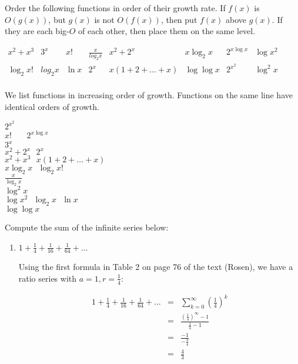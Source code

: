 \documentclass[12pt]{amsart}
\begin{document}
\begin{enumerate}
{\bf \item Order the following functions in order of their growth rate.  If $f(x)$ is $O(g(x))$, but $g(x)$ is not $O(f(x))$, then put $f(x)$ above $g(x)$.  If they are each big-$O$ of each other, then place them on the same level.

\medskip
\begin{math}
\begin{array}{llllllll}
x^2 + x^3 & 3^x & x! & \frac{x}{log_2 x} & x^2+2^x & x \log_2 x & 2^{x\log x} & \log x^2 \\
\log_2 x! & log_2 x & \ln x & 2^x & x(1+2+\ldots+x) & \log \log x & 2^{x^2} & \log^2 x \\
\end{array}
\end{math}
}

We list functions in increasing order of growth.  Functions on the
same line have identical orders of growth.

\begin{center}
$2^{x^2}$ \\
$x!$ \ \ \ $2^{x \log x}$\\
$3^x$ \\
$x^2 + 2^x \ \ \ 2^x$ \\
$x^2 + x^3 \ \ \ x(1 + 2 + \ldots + x)$ \\
$x \log_2 x \ \ \ \log_2 x!$ \\
$\frac{x}{\log_2 x}$ \\
$\log^2 x$ \\
$\log x^2 \ \ \ \log_2 x \ \ \ \ln x$ \\
$\log \log x $ \\
\end{center}

\medskip

{\bf \item Compute the sum of the infinite series below:}
\begin{enumerate}
\item {\bf $1 + \frac{1}{4} + \frac{1}{16} + \frac{1}{64} + \ldots$}

Using the first formula in Table 2 on page 76 of the text (Rosen), we have a ratio series with $a=1, r=\frac{1}{4}$:

\begin{eqnarray*}
1 + \frac{1}{4} + \frac{1}{16} + \frac{1}{64} + \ldots & = & \sum_{k=0}^\infty (\frac{1}{4})^k \\
& = & \frac{(\frac{1}{4})^\infty - 1}{\frac{1}{4} - 1} \\
& = & \frac{-1}{-\frac{3}{4}} \\
& = & \frac{4}{3}
\end{eqnarray*}


\end{enumerate}
\end{enumerate}
\end{document}
